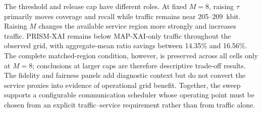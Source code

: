 The threshold and release cap have different roles. At fixed $M=8$, raising $\tau$ primarily moves coverage and recall while traffic remains near 205--209~kbit. Raising $M$ changes the available service region more strongly and increases traffic. PRISM-XAI remains below MAP-XAI-only traffic throughout the observed grid, with aggregate-mean ratio savings between 14.35\% and 16.56\%. The complete matched-region condition, however, is preserved across all cells only at $M=8$; conclusions at larger caps are therefore descriptive trade-off results. The fidelity and fairness panels add diagnostic context but do not convert the service proxies into evidence of operational grid benefit. Together, the sweep supports a configurable communication scheduler whose operating point must be chosen from an explicit traffic--service requirement rather than from traffic alone.
